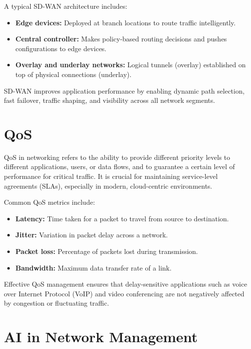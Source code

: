 \documentclass[a4paper,12pt]{Classes/RoboticsLaTeX}
\begin{document}
    A typical SD-WAN architecture includes:
    \begin{itemize}
        \item \textbf{Edge devices:} Deployed at branch locations to route traffic intelligently.
        \item \textbf{Central controller:} Makes policy-based routing decisions and pushes configurations to edge devices.
        \item \textbf{Overlay and underlay networks:} Logical tunnels (overlay) established on top of physical connections (underlay).
    \end{itemize}
    
    SD-WAN improves application performance by enabling dynamic path selection, fast failover, traffic shaping, and visibility across all network segments.
    
    \section{QoS}
    
    QoS in networking refers to the ability to provide different priority levels to different applications, users, or data flows, and to guarantee a certain level of performance for critical traffic. It is crucial for maintaining service-level agreements (SLAs), especially in modern, cloud-centric environments.
    
    Common QoS metrics include:
    \begin{itemize}
        \item \textbf{Latency:} Time taken for a packet to travel from source to destination.
        \item \textbf{Jitter:} Variation in packet delay across a network.
        \item \textbf{Packet loss:} Percentage of packets lost during transmission.
        \item \textbf{Bandwidth:} Maximum data transfer rate of a link.
    \end{itemize}
    
    Effective QoS management ensures that delay-sensitive applications such as voice over Internet Protocol (VoIP) and video conferencing are not negatively affected by congestion or fluctuating traffic.
    
    \section{AI in Network Management}
\end{document}

